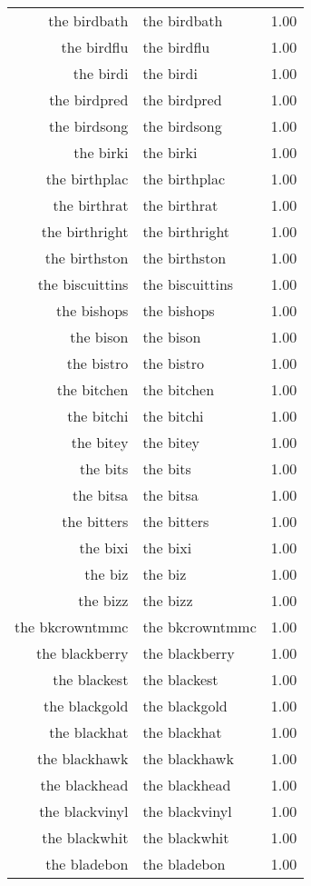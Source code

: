 \begin{table}[ht]
\begin{tabular}{rlr}
  the birdbath & the birdbath & 1.00 \\ 
  the birdflu & the birdflu & 1.00 \\ 
  the birdi & the birdi & 1.00 \\ 
  the birdpred & the birdpred & 1.00 \\ 
  the birdsong & the birdsong & 1.00 \\ 
  the birki & the birki & 1.00 \\ 
  the birthplac & the birthplac & 1.00 \\ 
  the birthrat & the birthrat & 1.00 \\ 
  the birthright & the birthright & 1.00 \\ 
  the birthston & the birthston & 1.00 \\ 
  the biscuittins & the biscuittins & 1.00 \\ 
  the bishops & the bishops & 1.00 \\ 
  the bison & the bison & 1.00 \\ 
  the bistro & the bistro & 1.00 \\ 
  the bitchen & the bitchen & 1.00 \\ 
  the bitchi & the bitchi & 1.00 \\ 
  the bitey & the bitey & 1.00 \\ 
  the bits & the bits & 1.00 \\ 
  the bitsa & the bitsa & 1.00 \\ 
  the bitters & the bitters & 1.00 \\ 
  the bixi & the bixi & 1.00 \\ 
  the biz & the biz & 1.00 \\ 
  the bizz & the bizz & 1.00 \\ 
  the bkcrowntmmc & the bkcrowntmmc & 1.00 \\ 
  the blackberry & the blackberry & 1.00 \\ 
  the blackest & the blackest & 1.00 \\ 
  the blackgold & the blackgold & 1.00 \\ 
  the blackhat & the blackhat & 1.00 \\ 
  the blackhawk & the blackhawk & 1.00 \\ 
  the blackhead & the blackhead & 1.00 \\ 
  the blackvinyl & the blackvinyl & 1.00 \\ 
  the blackwhit & the blackwhit & 1.00 \\ 
  the bladebon & the bladebon & 1.00 \\ 

\end{tabular}
\end{table}
